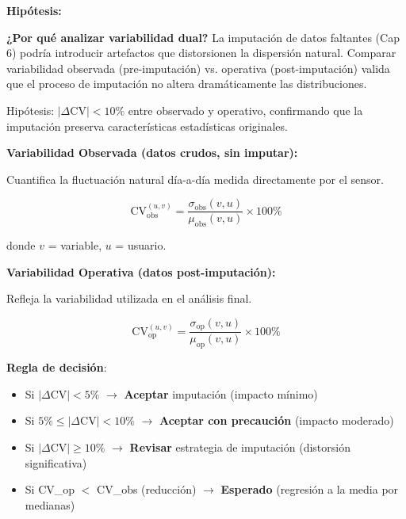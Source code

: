\documentclass[12pt,letterpaper,twoside]{report}
\begin{document}
\begin{calculobox}
\begin{hipotesisbox}
\textbf{Hipótesis:}

\textbf{¿Por qué analizar variabilidad dual?} La imputación de datos faltantes (Cap 6) podría introducir artefactos que distorsionen la dispersión natural. Comparar variabilidad observada (pre-imputación) vs. operativa (post-imputación) valida que el proceso de imputación no altera dramáticamente las distribuciones.

Hipótesis: $|\Delta\text{CV}| < 10\%$ entre observado y operativo, confirmando que la imputación preserva características estadísticas originales.
\end{hipotesisbox}

\begin{estadisticobox}
\textbf{Variabilidad Observada (datos crudos, sin imputar):}

Cuantifica la fluctuación natural día-a-día medida directamente por el sensor.

\begin{equation}
\text{CV}_{\text{obs}}^{(u,v)} = \frac{\sigma_{\text{obs}}(v, u)}{\mu_{\text{obs}}(v, u)} \times 100\%
\end{equation}

donde $v$ = variable, $u$ = usuario.

\textbf{Variabilidad Operativa (datos post-imputación):}

Refleja la variabilidad utilizada en el análisis final.

\begin{equation}
\text{CV}_{\text{op}}^{(u,v)} = \frac{\sigma_{\text{op}}(v, u)}{\mu_{\text{op}}(v, u)} \times 100\%
\end{equation}
\end{estadisticobox}

\begin{reglabox}
\textbf{Regla de decisión}:

\begin{itemize}[noitemsep]
    \item Si $|\Delta\text{CV}| < 5\%$ $\to$ \textbf{Aceptar} imputación (impacto mínimo)
    \item Si $5\% \leq |\Delta\text{CV}| < 10\%$ $\to$ \textbf{Aceptar con precaución} (impacto moderado)
    \item Si $|\Delta\text{CV}| \geq 10\%$ $\to$ \textbf{Revisar} estrategia de imputación (distorsión significativa)
    \item Si CV\_op $<$ CV\_obs (reducción) $\to$ \textbf{Esperado} (regresión a la media por medianas)
\end{itemize}
\end{reglabox}


\end{calculobox}
\end{document}
